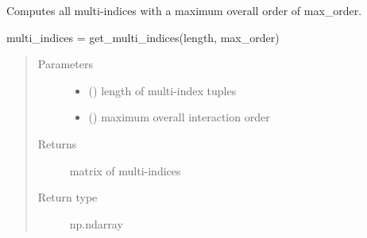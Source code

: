 \documentclass[letterpaper,10pt,english,openany,oneside]{sphinxmanual}
\begin{document}

\begin{fulllineitems}
\label{\detokenize{pygpc:pygpc.misc.get_multi_indices}}
Computes all multi-indices with a maximum overall order of max\_order.

multi\_indices = get\_multi\_indices(length, max\_order)
\begin{quote}\begin{description}
\item[{Parameters}] \leavevmode\begin{itemize}
\item {} 
 () \textendash{} length of multi-index tuples

\item {} 
 () \textendash{} maximum overall interaction order

\end{itemize}

\item[{Returns}] \leavevmode
{} \textendash{} matrix of multi-indices

\item[{Return type}] \leavevmode
np.ndarray

\end{description}\end{quote}

\end{fulllineitems}

\end{document}
